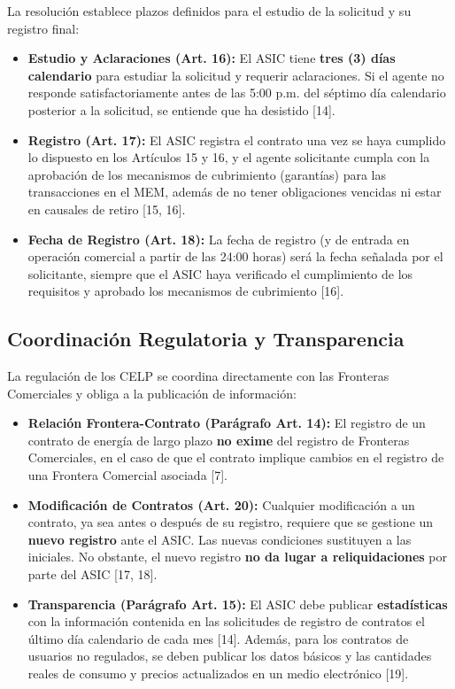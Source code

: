 \documentclass[a5paper]{book}%
\begin{document}
  La resolución establece plazos definidos para el estudio de la solicitud y su registro final:
  
  \begin{itemize}
  	\item \textbf{Estudio y Aclaraciones (Art. 16):} El ASIC tiene \textbf{tres (3) días calendario} para estudiar la solicitud y requerir aclaraciones. Si el agente no responde satisfactoriamente antes de las 5:00 p.m. del séptimo día calendario posterior a la solicitud, se entiende que ha desistido [14].
  	\item \textbf{Registro (Art. 17):} El ASIC registra el contrato una vez se haya cumplido lo dispuesto en los Artículos 15 y 16, y el agente solicitante cumpla con la aprobación de los mecanismos de cubrimiento (garantías) para las transacciones en el MEM, además de no tener obligaciones vencidas ni estar en causales de retiro [15, 16].
  	\item \textbf{Fecha de Registro (Art. 18):} La fecha de registro (y de entrada en operación comercial a partir de las 24:00 horas) será la fecha señalada por el solicitante, siempre que el ASIC haya verificado el cumplimiento de los requisitos y aprobado los mecanismos de cubrimiento [16].
  \end{itemize}
  
  \subsection{Coordinación Regulatoria y Transparencia}
  
  La regulación de los CELP se coordina directamente con las Fronteras Comerciales y obliga a la publicación de información:
  
  \begin{itemize}
  	\item \textbf{Relación Frontera-Contrato (Parágrafo Art. 14):} El registro de un contrato de energía de largo plazo \textbf{no exime} del registro de Fronteras Comerciales, en el caso de que el contrato implique cambios en el registro de una Frontera Comercial asociada [7].
  	\item \textbf{Modificación de Contratos (Art. 20):} Cualquier modificación a un contrato, ya sea antes o después de su registro, requiere que se gestione un \textbf{nuevo registro} ante el ASIC. Las nuevas condiciones sustituyen a las iniciales. No obstante, el nuevo registro \textbf{no da lugar a reliquidaciones} por parte del ASIC [17, 18].
  	\item \textbf{Transparencia (Parágrafo Art. 15):} El ASIC debe publicar \textbf{estadísticas} con la información contenida en las solicitudes de registro de contratos el último día calendario de cada mes [14]. Además, para los contratos de usuarios no regulados, se deben publicar los datos básicos y las cantidades reales de consumo y precios actualizados en un medio electrónico [19].
  \end{itemize}
  
\end{document}
